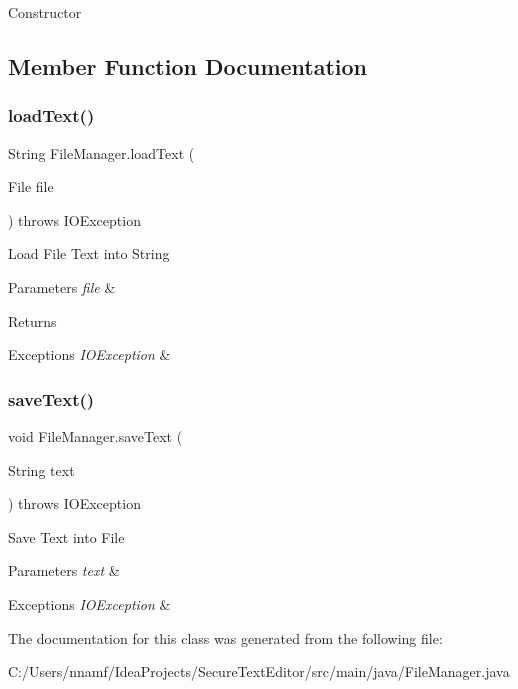 Constructor 

\subsection{Member Function Documentation}
\mbox{\label{class_file_manager_a9515f15130ff9682ad9c5d4e0bea1a68}} 
\subsubsection{\texorpdfstring{load\+Text()}{loadText()}}
{\footnotesize\ttfamily String File\+Manager.\+load\+Text (\begin{DoxyParamCaption}\item[{File}]{file }\end{DoxyParamCaption}) throws I\+O\+Exception}

Load File Text into String 
\begin{DoxyParams}{Parameters}
{\em file} & \\
\hline
\end{DoxyParams}
\begin{DoxyReturn}{Returns}

\end{DoxyReturn}

\begin{DoxyExceptions}{Exceptions}
{\em I\+O\+Exception} & \\
\hline
\end{DoxyExceptions}
\mbox{\label{class_file_manager_a8e3de78e77b7bf9e4a4581577ff75b23}} 
\subsubsection{\texorpdfstring{save\+Text()}{saveText()}}
{\footnotesize\ttfamily void File\+Manager.\+save\+Text (\begin{DoxyParamCaption}\item[{String}]{text }\end{DoxyParamCaption}) throws I\+O\+Exception}

Save Text into File 
\begin{DoxyParams}{Parameters}
{\em text} & \\
\hline
\end{DoxyParams}

\begin{DoxyExceptions}{Exceptions}
{\em I\+O\+Exception} & \\
\hline
\end{DoxyExceptions}


The documentation for this class was generated from the following file\+:\begin{DoxyCompactItemize}
\item 
C\+:/\+Users/nnamf/\+Idea\+Projects/\+Secure\+Text\+Editor/src/main/java/File\+Manager.\+java\end{DoxyCompactItemize}
